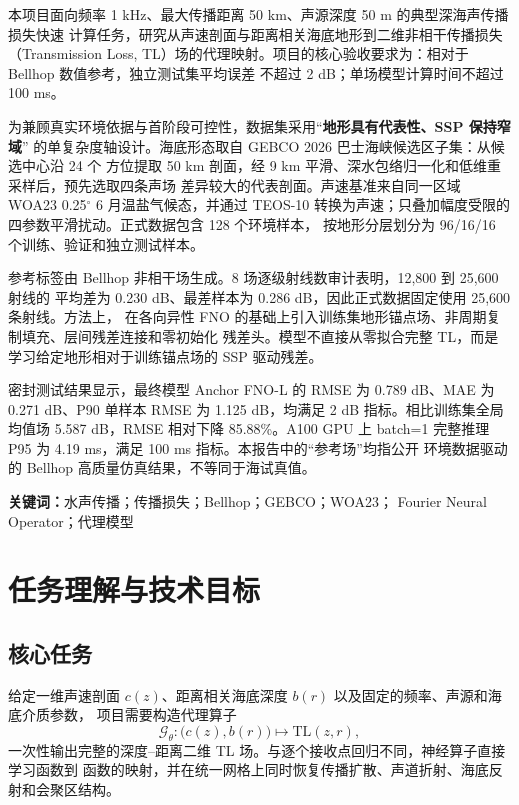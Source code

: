 \documentclass[UTF8,11pt]{ctexart}
\newcommand{\TL}{\mathrm{TL}}
\newcommand{\BestModel}{Anchor FNO-L}
\newcommand{\BestRMSE}{0.789}
\newcommand{\BestMAE}{0.271}
\newcommand{\BestPninety}{1.125}
\newcommand{\GlobalBaseline}{5.587}
\newcommand{\RelativeReduction}{85.88}
\newcommand{\GpuPninetyfive}{4.19}
\begin{document}
本项目面向频率 1 kHz、最大传播距离 50 km、声源深度 50 m 的典型深海声传播损失快速
计算任务，研究从声速剖面与距离相关海底地形到二维非相干传播损失（Transmission Loss,
TL）场的代理映射。项目的核心验收要求为：相对于 Bellhop 数值参考，独立测试集平均误差
不超过 2 dB；单场模型计算时间不超过 100 ms。

为兼顾真实环境依据与首阶段可控性，数据集采用“\textbf{地形具有代表性、SSP 保持窄域}”
的单复杂度轴设计。海底形态取自 GEBCO 2026 巴士海峡候选区子集：从候选中心沿 24 个
方位提取 50 km 剖面，经 9 km 平滑、深水包络归一化和低维重采样后，预先选取四条声场
差异较大的代表剖面。声速基准来自同一区域 WOA23 0.25$^\circ$ 6 月温盐气候态，并通过
TEOS-10 转换为声速；只叠加幅度受限的四参数平滑扰动。正式数据包含 128 个环境样本，
按地形分层划分为 96/16/16 个训练、验证和独立测试样本。

参考标签由 Bellhop 非相干场生成。8 场逐级射线数审计表明，12,800 到 25,600 射线的
平均差为 0.230 dB、最差样本为 0.286 dB，因此正式数据固定使用 25,600 条射线。方法上，
在各向异性 FNO 的基础上引入训练集地形锚点场、非周期复制填充、层间残差连接和零初始化
残差头。模型不直接从零拟合完整 TL，而是学习给定地形相对于训练锚点场的 SSP 驱动残差。

密封测试结果显示，最终模型 \BestModel{} 的 RMSE 为 \BestRMSE{} dB、MAE 为
\BestMAE{} dB、P90 单样本 RMSE 为 \BestPninety{} dB，均满足 2 dB 指标。相比训练集全局
均值场 \GlobalBaseline{} dB，RMSE 相对下降 \RelativeReduction{}\%。A100 GPU 上 batch=1
完整推理 P95 为 \GpuPninetyfive{} ms，满足 100 ms 指标。本报告中的“参考场”均指公开
环境数据驱动的 Bellhop 高质量仿真结果，不等同于海试真值。

\vspace{0.5cm}
\noindent\textbf{关键词：}水声传播；传播损失；Bellhop；GEBCO；WOA23；
Fourier Neural Operator；代理模型

\clearpage
\tableofcontents
\clearpage
{}

\section{任务理解与技术目标}

\subsection{核心任务}

给定一维声速剖面 $c(z)$、距离相关海底深度 $b(r)$ 以及固定的频率、声源和海底介质参数，
项目需要构造代理算子
\begin{equation}
  \mathcal{G}_\theta:\big(c(z),b(r)\big)\longmapsto \TL(z,r),
\end{equation}
一次性输出完整的深度--距离二维 TL 场。与逐个接收点回归不同，神经算子直接学习函数到
函数的映射，并在统一网格上同时恢复传播扩散、声道折射、海底反射和会聚区结构。
\end{document}
